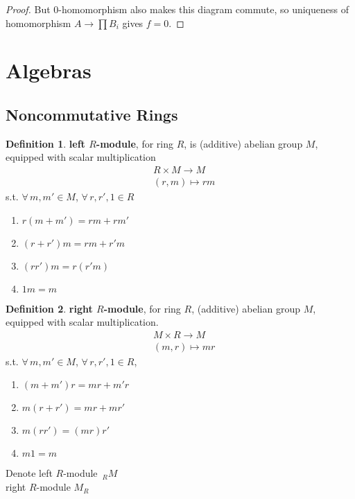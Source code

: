 \documentclass[twoside,landscape]{amsart}
\theoremstyle{plain}
\theoremstyle{definition}
\newtheorem{definition}{Definition}
\theoremstyle{remark}
\begin{document}
\begin{multicols*}{2}
\begin{proof}
But $0$-homomorphism also makes this diagram commute, so uniqueness of homomorphism $A \to \prod B_i$ gives $f=0$.  




  \end{proof}





\section{Algebras }

\subsection{Noncommutative Rings}

\begin{definition}
\textbf{left $R$-module}, for ring $R$, is (additive) abelian group $M$, equipped with scalar multiplication
\begin{equation}
	\begin{aligned}
	& R\times M \to M \\
	& (r,m) \mapsto rm 
\end{aligned}
\end{equation}
s.t. $\forall \, m,m' \in M$, $\forall \, r,r', 1 \in R$
\begin{enumerate}
\item $r(m+m')  = rm + rm'$ 
\item $(r+r')m = rm +r'm$
\item $(rr')m = r(r'm)$
\item $1m = m$
\end{enumerate}
\end{definition}

\begin{definition}
\textbf{right $R$-module}, for ring $R$, (additive) abelian group $M$, equipped with scalar multiplication.  
\begin{equation}
\begin{aligned}	
	& M\times R \to M \\ 
	& (m,r) \mapsto mr 
\end{aligned}
\end{equation}
s.t. $\forall \, m,m' \in M$, $\forall \, r,r', 1 \in R$,  
\begin{enumerate}
\item $(m+m')r= mr+m'r$
\item $m(r+r') = mr + mr'$
\item $m(rr') = (mr)r'$
\item $m1=m$
\end{enumerate}
\end{definition}
Denote left $R$-module ${\,}_{R}M$  \\
\phantom{Denote} right $R$-module $M_R$  \\


\end{multicols*}
\end{document}
